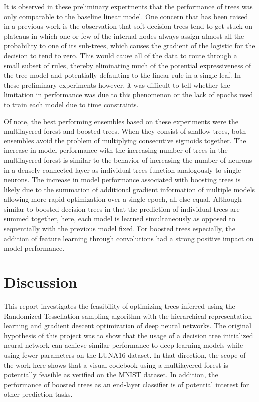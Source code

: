 \documentclass[a4paper,11pt,final]{article}
\begin{document}
It is observed in these preliminary experiments that the performance of trees was only comparable to the baseline linear model. One concern that has been raised in a previous work \cite{DBLP:journals/corr/abs-1711-09784} is the observation that soft decision trees tend to get stuck on plateaus in which one or few of the internal nodes always assign almost all the probability to one of its sub-trees, which causes the gradient of the logistic for the decision to tend to zero. This would cause all of the data to route through a small subset of rules, thereby eliminating much of the potential expressiveness of the tree model and potentially defaulting to the linear rule in a single leaf. In these preliminary experiments however, it was difficult to tell whether the limitation in performance was due to this phenomenon or the lack of epochs used to train each model due to time constraints.

Of note, the best performing ensembles based on these experiments were the multilayered forest and boosted trees. When they consist of shallow trees, both ensembles avoid the problem of multiplying consecutive sigmoids together. The increase in model performance with the increasing number of trees in the multilayered forest is similar to the behavior of increasing the number of neurons in a densely connected layer as individual trees function analogously to single neurons. The increase in model performance associated with boosting trees is likely due to the summation of additional gradient information of multiple models allowing more rapid optimization over a single epoch, all else equal. Although similar to boosted decision trees in that the prediction of individual trees are summed together, here, each model is learned simultaneously as opposed to sequentially with the previous model fixed. For boosted trees especially, the addition of feature learning through convolutions had a strong positive impact on model performance.

\section{Discussion}

This report investigates the feasibility of optimizing trees inferred using the Randomized Tessellation sampling algorithm with the hierarchical representation learning and gradient descent optimization of deep neural networks. The original hypothesis of this project was to show that the usage of a decision tree initialized neural network can achieve similar performance to deep learning models while using fewer parameters on the LUNA16 dataset. In that direction, the scope of the work here shows that a visual codebook using a multilayered forest is potentially feasible as verified on the MNIST dataset. In addition, the performance of boosted trees as an end-layer classifier is of potential interest for other prediction tasks.
\end{document}

